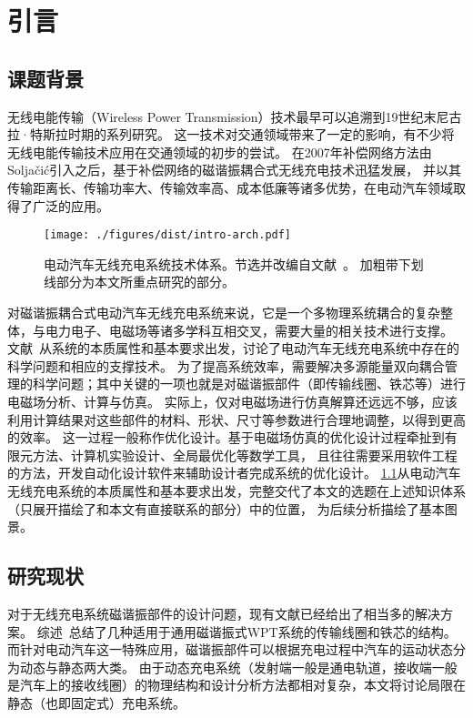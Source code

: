 \documentclass[index]{subfiles}
\begin{document}
\chapter{引言}\label{sec:intro}
\section{课题背景}
无线电能传输（Wireless Power Transmission）技术最早可以追溯到19世纪末尼古拉·特斯拉时期的系列研究\cite{barrett1894}。
这一技术对交通领域带来了一定的影响，有不少将无线电能传输技术应用在交通领域的初步的尝试\cite{eghtesadi1990}。
在2007年补偿网络方法由Solja\v{c}i\'c引入\cite{kurs2007}之后，基于补偿网络的磁谐振耦合式无线充电技术迅猛发展，
并以其传输距离长、传输功率大、传输效率高、成本低廉等诸多优势，在电动汽车领域取得了广泛的应用\cite{高大威2015}。

\begin{figure}[htb]
  \centering
  \texttt{[image: ./figures/dist/intro-arch.pdf]}
  \caption[电动汽车无线充电系统技术体系]{电动汽车无线充电系统技术体系。节选并改编自文献~\cite{高大威2015}。
  加粗带下划线部分为本文所重点研究的部分。\label{fig:intro-arch}}
\end{figure}

对磁谐振耦合式电动汽车无线充电系统来说，它是一个多物理系统耦合的复杂整体，与电力电子、电磁场等诸多学科互相交叉，需要大量的相关技术进行支撑。
文献~从系统的本质属性和基本要求出发，讨论了电动汽车无线充电系统中存在的科学问题和相应的支撑技术。
为了提高系统效率，需要解决多源能量双向耦合管理的科学问题；其中关键的一项也就是对磁谐振部件（即传输线圈、铁芯等）进行电磁场分析、计算与仿真。
实际上，仅对电磁场进行仿真解算还远远不够，应该利用计算结果对这些部件的材料、形状、尺寸等参数进行合理地调整，以得到更高的效率。
这一过程一般称作优化设计。基于电磁场仿真的优化设计过程牵扯到有限元方法、计算机实验设计、全局最优化等数学工具，
且往往需要采用软件工程的方法，开发自动化设计软件来辅助设计者完成系统的优化设计。
\cref{fig:intro-arch}从电动汽车无线充电系统的本质属性和基本要求出发，完整交代了本文的选题在上述知识体系（只展开描绘了和本文有直接联系的部分）中的位置，
为后续分析描绘了基本图景。

\section{研究现状}
对于无线充电系统磁谐振部件的设计问题，现有文献已经给出了相当多的解决方案。
综述~\cite{张艺明2016}总结了几种适用于通用磁谐振式WPT系统的传输线圈和铁芯的结构。
而针对电动汽车这一特殊应用，磁谐振部件可以根据充电过程中汽车的运动状态分为动态与静态两大类\cite{赵争鸣2016}。
由于动态充电系统（发射端一般是通电轨道，接收端一般是汽车上的接收线圈）的物理结构和设计分析方法都相对复杂，本文将讨论局限在静态（也即固定式）充电系统。
\end{document}
